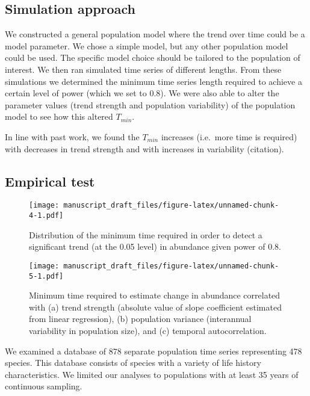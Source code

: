 \documentclass[12pt,]{article}
\begin{document}
\subsection{Simulation approach}\label{simulation-approach-1}

We constructed a general population model where the trend over time
could be a model parameter. We chose a simple model, but any other
population model could be used. The specific model choice should be
tailored to the population of interest. We then ran simulated time
series of different lengths. From these simulations we determined the
minimum time series length required to achieve a certain level of power
(which we set to 0.8). We were also able to alter the parameter values
(trend strength and population variability) of the population model to
see how this altered \(T_{min}\).

In line with past work, we found the \(T_{min}\) increases (i.e.~more
time is required) with decreases in trend strength and with increases in
variability (citation).

\subsection{Empirical test}\label{empirical-test}

\begin{figure}[htbp]
\centering
\texttt{[image: manuscript\_draft\_files/figure-latex/unnamed-chunk-4-1.pdf]}
\caption{Distribution of the minimum time required in order to detect a
significant trend (at the 0.05 level) in abundance given power of
0.8.\label{fig:min_time_dist}}
\end{figure}

\begin{figure}[htbp]
\centering
\texttt{[image: manuscript\_draft\_files/figure-latex/unnamed-chunk-5-1.pdf]}
\caption{Minimum time required to estimate change in abundance
correlated with (a) trend strength (absolute value of slope coefficient
estimated from linear regression), (b) population variance (interannual
variability in population size), and (c) temporal
autocorrelation.\label{fig:correlates}}
\end{figure}

We examined a database of 878 separate population time series
representing 478 species. This database consists of species with a
variety of life history characteristics. We limited our analyses to
populations with at least 35 years of continuous sampling.
\end{document}
